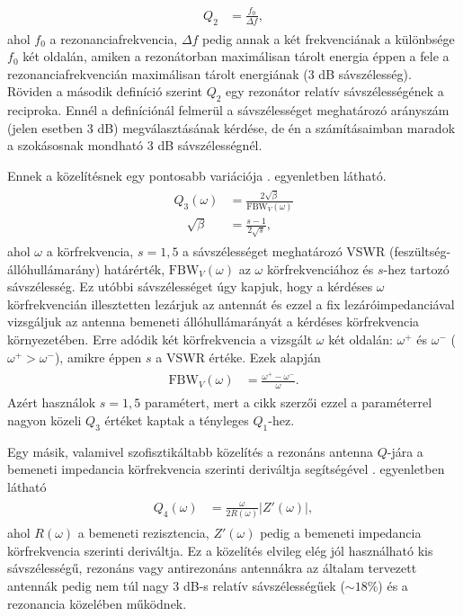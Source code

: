 		\begin{align}
			\begin{split}\label{equ:Q2}
				Q_2 & = \frac{f_0}{\Delta f},
			\end{split}
		\end{align}
		ahol $f_0$ a rezonanciafrekvencia, $\Delta f$ pedig annak a két frekvenciának a különbsége $f_0$ két oldalán, amiken a rezonátorban maximálisan tárolt energia éppen a fele a rezonanciafrekvencián maximálisan tárolt energiának (3 dB sávszélesség). Röviden a második definíció szerint $Q_2$ egy rezonátor relatív sávszélességének a reciproka. Ennél a definíciónál felmerül a sávszélességet meghatározó arányszám (jelen esetben 3 dB) megválasztásának kérdése, de én a számításaimban maradok a szokásosnak mondható 3 dB sávszélességnél.
		\par Ennek a közelítésnek egy pontosabb variációja \cite{ibqa} . egyenletben látható.
		\begin{align}
			\begin{split}\label{equ:Q3}
				Q_3(\omega) & = \frac{2 \sqrt{\beta}}{\text{FBW}_V(\omega)} \\[0.5em]
				\quad \sqrt{\beta} & = \frac{s-1}{2\sqrt{s}},
			\end{split}
		\end{align}
		ahol $\omega$ a körfrekvencia, $s=1,5$ a sávszélességet meghatározó VSWR (feszültség-állóhullámarány) határérték, $\text{FBW}_{V}(\omega)$ az $\omega$ körfrekvenciához és $s$-hez tartozó sávszélesség. Ez utóbbi sávszélességet úgy kapjuk, hogy a kérdéses $\omega$ körfrekvencián illesztetten lezárjuk az antennát és ezzel a fix lezáróimpedanciával vizsgáljuk az antenna bemeneti állóhullámarányát a kérdéses körfrekvencia környezetében. Erre adódik két körfrekvencia a vizsgált $\omega$ két oldalán: $\omega^+$ és $\omega^-$ ($\omega^+ > \omega^-$), amikre éppen $s$ a VSWR értéke. Ezek alapján
		\begin{align}
			\begin{split}
				\text{FBW}_V(\omega) & = \frac{\omega^+ - \omega^-}{\omega}.
			\end{split}
		\end{align}
		 Azért használok $s=1,5$ paramétert, mert a \cite{ibqa} cikk szerzői ezzel a paraméterrel nagyon közeli $Q_3$ értéket kaptak a tényleges $Q_1$-hez.
		\par Egy másik, valamivel szofisztikáltabb közelítés a rezonáns antenna $Q$-jára a bemeneti impedancia körfrekvencia szerinti deriváltja segítségével \cite{ibqa} . egyenletben látható 
		\begin{align}
			\begin{split}\label{equ:Q4}
				Q_4(\omega) & = \frac{\omega}{2 R(\omega)}|Z'(\omega)|,
			\end{split}
		\end{align}
		ahol $R(\omega)$ a bemeneti rezisztencia, $Z'(\omega)$ pedig a bemeneti impedancia körfrekvencia szerinti deriváltja. Ez a közelítés elvileg elég jól használható kis sávszélességű, rezonáns vagy antirezonáns antennákra az általam tervezett antennák pedig nem túl nagy 3 dB-s relatív sávszélességűek ($\sim 18\%$) és a rezonancia közelében működnek.
